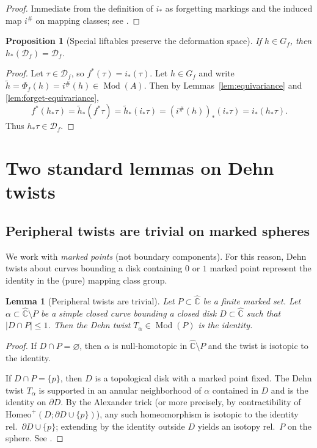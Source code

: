 \documentclass[11pt]{article}
\newtheorem{lemma}[theorem]{Lemma}
\newtheorem{proposition}[theorem]{Proposition}
\DeclareMathOperator{\Mod}{Mod}
\begin{document}
\begin{proof}
Immediate from the definition of $i_*$ as forgetting markings and the induced map $i^\#$ on mapping classes; see \cite[\S2]{FM12}.
\end{proof}

\begin{proposition}[Special liftables preserve the deformation space]\label{prop:Gf-preserves}
If $h\in G_f$, then $h_*(\mathcal D_f)=\mathcal D_f$.
\end{proposition}

\begin{proof}
Let $\tau\in \mathcal D_f$, so $f^*(\tau)=i_*(\tau)$. Let $h\in G_f$ and write $\widetilde h=\Phi_f(h)=i^\#(h)\in \Mod(A)$. Then by Lemmas~\ref{lem:equivariance} and \ref{lem:forget-equivariance},
\[
f^*(h_*\tau)=\widetilde h_*(f^*\tau)=\widetilde h_*(i_*\tau)=(i^\#(h))_*(i_*\tau)=i_*(h_*\tau).
\]
Thus $h_*\tau\in \mathcal D_f$.
\end{proof}

\section{Two standard lemmas on Dehn twists}

\subsection{Peripheral twists are trivial on marked spheres}
We work with \emph{marked points} (not boundary components). For this reason, Dehn twists about curves bounding a disk containing $0$ or $1$ marked point represent the identity in the (pure) mapping class group.

\begin{lemma}[Peripheral twists are trivial]\label{lem:peripheral-trivial}
Let $P\subset \widehat{\mathbb C}$ be a finite marked set. Let $\alpha\subset \widehat{\mathbb C}\setminus P$ be a simple closed curve bounding a closed disk $D\subset \widehat{\mathbb C}$ such that $|D\cap P|\le 1$. Then the Dehn twist $T_\alpha\in \Mod(P)$ is the identity.
\end{lemma}

\begin{proof}
If $D\cap P=\varnothing$, then $\alpha$ is null-homotopic in $\widehat{\mathbb C}\setminus P$ and the twist is isotopic to the identity.

If $D\cap P=\{p\}$, then $D$ is a topological disk with a marked point fixed. The Dehn twist $T_\alpha$ is supported in an annular neighborhood of $\alpha$ contained in $D$ and is the identity on $\partial D$. By the Alexander trick (or more precisely, by contractibility of $\mathrm{Homeo}^+(D;\partial D\cup\{p\})$), any such homeomorphism is isotopic to the identity rel.\ $\partial D\cup\{p\}$; extending by the identity outside $D$ yields an isotopy rel.\ $P$ on the sphere. See \cite[Example 3.10]{FM12}.
\end{proof}
\end{document}
